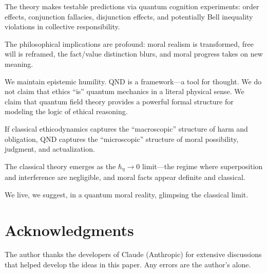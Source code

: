 \documentclass[12pt]{article}
\begin{document}
The theory makes testable predictions via quantum cognition experiments: order effects, conjunction fallacies, disjunction effects, and potentially Bell inequality violations in collective responsibility.

The philosophical implications are profound: moral realism is transformed, free will is reframed, the fact/value distinction blurs, and moral progress takes on new meaning.

We maintain epistemic humility. QND is a framework---a tool for thought. We do not claim that ethics ``is'' quantum mechanics in a literal physical sense. We claim that quantum field theory provides a powerful formal structure for modeling the logic of ethical reasoning.

If classical ethicodynamics captures the ``macroscopic'' structure of harm and obligation, QND captures the ``microscopic'' structure of moral possibility, judgment, and actualization.

The classical theory emerges as the $\hbar_\eta \to 0$ limit---the regime where superposition and interference are negligible, and moral facts appear definite and classical.

We live, we suggest, in a quantum moral reality, glimpsing the classical limit.

\section*{Acknowledgments}

The author thanks the developers of Claude (Anthropic) for extensive discussions that helped develop the ideas in this paper. Any errors are the author's alone.
\end{document}
